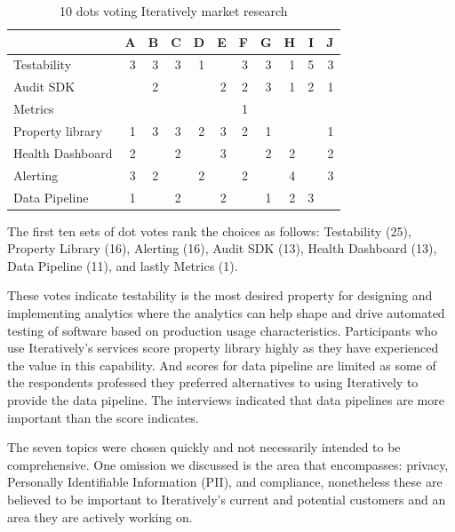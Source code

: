 \begin{table}[ht]
 
    \centering
    \small
    \setlength{\tabcolsep}{4pt} %
    \begin{tabular}{lrrrrrrrrrr}
         &A  &B  &C  &D  &E  &F  &G  &H  &I  &J \\
    \hline     
    Testability          &3  &3  &3  &1  &   &3  &3  &1  &5  &3 \\
    Audit SDK            &   &2  &   &   &2  &2  &3  &1  &2  &1 \\
    Metrics              &   &   &   &   &   &1  &   &   &   &  \\
    Property library     &1  &3  &3  &2  &3  &2  &1  &   &   &1 \\
    Health Dashboard     &2  &   &2  &   &3  &   &2  &2  &   &2 \\
    Alerting             &3  &2  &   &2  &   &2  &   &4  &   &3 \\
    Data Pipeline        &1  &   &2  &   &2  &   &1  &2  &3  &  \\
         
    \end{tabular}
    \caption{10 dots voting Iteratively market research}
    \label{tab:10dots_voting_iteratively}

\end{table}

The first ten sets of dot votes rank the choices as follows: Testability (25), Property Library (16), Alerting (16), Audit SDK (13), Health Dashboard (13), Data Pipeline (11), and lastly Metrics (1). 

These votes indicate testability is the most desired property for designing and implementing analytics where the analytics can help shape and drive automated testing of software based on production usage characteristics. Participants who use Iteratively's services score property library highly as they have experienced the value in this capability. And scores for data pipeline are limited as some of the respondents professed they preferred alternatives to using Iteratively to provide the data pipeline. The interviews indicated that data pipelines are more important than the score indicates.

The seven topics were chosen quickly and not necessarily intended to be comprehensive. One omission we discussed is the area that encompasses: privacy, Personally Identifiable Information (PII), and compliance, nonetheless these are believed to be important to Iteratively's current and potential customers and an area they are actively working on.


